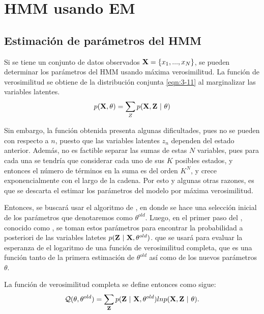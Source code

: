 
\chapter{HMM usando EM} \label{ch:chap3}

\section{Estimación de parámetros del HMM}

Si se tiene un conjunto de datos observados $\textbf{X} = \lbrace x_1, ..., x_N \rbrace$, se pueden determinar 
los parámetros del HMM usando máxima verosimilitud. La función de verosimilitud se obtiene de la distribución 
conjunta \eqref{eqn:3-11} al marginalizar las variables latentes.
\begin{equation}
p(\textbf{X}, \theta) = \sum_Z p(\textbf{X}, \textbf{Z} ~|~ \theta)
\label{eqn:3-12}
\end{equation}

Sin embargo, la función obtenida presenta algunas dificultades, pues no se pueden con respecto a $n$, puesto que 
las variables latentes $z_n$ dependen del estado anterior. Además, no es factible separar las sumas de estas $N$ 
variables, pues para cada una se tendría que considerar cada uno de sus $K$ posibles estados, y entonces el número 
de términos en la suma es del orden $K^N$, y crece exponencialmente con el largo de la cadena. Por esto y algunas 
otras razones, es que se descarta el estimar los parámetros del modelo por máxima verosimilitud.

Entonces, se buscará usar el algoritmo de \aem, en donde se hace una selección inicial de los parámetros que 
denotaremos como $\theta^{old}$. Luego, en el primer paso del \aem, conocido como \estep, se toman estos 
parámetros para encontrar la probabilidad a posteriori de las variables latetes $p(\textbf{Z} ~|~ \textbf{X}, \theta^{old})$.
que se usará para evaluar la esperanza de el logaritmo de una función de verosimilitud completa, que es una función 
tanto de la primera estimación de $\theta^{old}$ así como de los nuevos parámetros $\theta$.

La función de verosimilitud completa se define entonces como sigue:
\begin{equation}
\mathcal{Q}(\theta, \theta^{old}) = \sum_{\textbf{Z}} p(\textbf{Z} ~|~ \textbf{X}, \theta^{old})
ln p(\textbf{X}, \textbf{Z} ~|~ \theta).
\label{eqn:3-13}
\end{equation}

